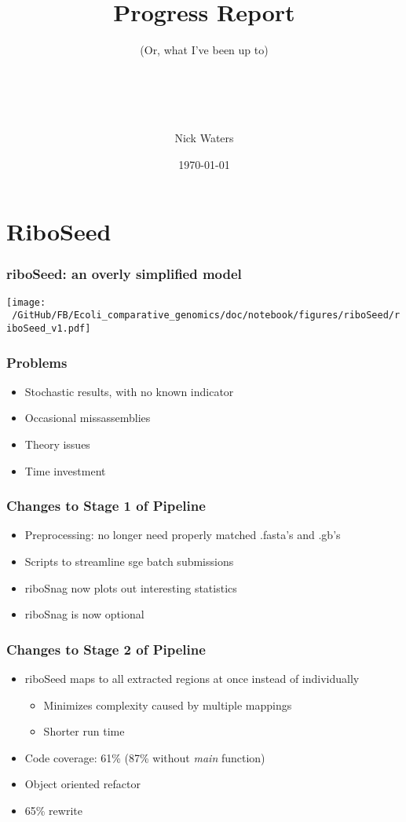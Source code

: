 \documentclass[10pt, compress]{beamer}
\title{Progress Report}
\subtitle{{\small (Or, what I've been up to)}}
\date{\footnotesize{\today}}
\author{\\ \\ \\ \\Nick Waters}
\institute{
  National University of Ireland, Galway\\
James Hutton Institue }
\begin{document}
\maketitle

\section{RiboSeed}

\begin{frame}[fragile]
  \frametitle{riboSeed: an overly simplified model}
  \texttt{[image: ~/GitHub/FB/Ecoli\_comparative\_genomics/doc/notebook/figures/riboSeed/riboSeed\_v1.pdf]}
\end{frame}

\begin{frame}[fragile]
  \frametitle{Problems}
  \begin{itemize}
    \item Stochastic results, with no known indicator
    \item Occasional missassemblies
    \item Theory issues
    \item Time investment
    \end{itemize}
\end{frame}

\begin{frame}[fragile]
  \frametitle{Changes to Stage 1 of Pipeline}
  \begin{itemize}
    \item Preprocessing: no longer need properly matched .fasta's and .gb's
    \item Scripts to streamline sge batch submissions
    \item riboSnag now plots out interesting statistics
    \item riboSnag is now optional
    \end{itemize}
\end{frame}

\begin{frame}[fragile]
  \frametitle{Changes to Stage 2 of Pipeline}
  \begin{itemize}
    \item riboSeed maps to all extracted regions at once instead of individually
  \begin{itemize}
  \item Minimizes complexity caused by multiple mappings
    \item Shorter run time
    \end{itemize}
    \item Code coverage: 61\% (87\% without \textit{main} function)
    \item Object oriented refactor
    \item 65\% rewrite
    \end{itemize}
\end{frame}
\end{document}
